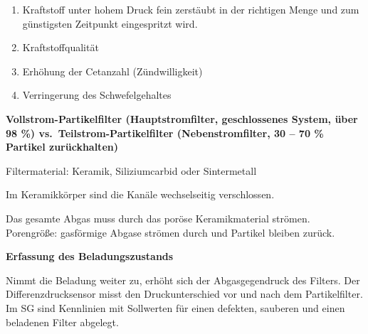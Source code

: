 \begin{enumerate}
\item
  Kraftstoff unter hohem Druck fein zerstäubt in der richtigen Menge und
  zum günstigsten Zeitpunkt eingespritzt wird.
\item
  Kraftstoffqualität
\item
  Erhöhung der Cetanzahl (Zündwilligkeit)
\item
  Verringerung des Schwefelgehaltes
\end{enumerate}

\textbf{Vollstrom-Partikelfilter (Hauptstromfilter, geschlossenes
System, über 98 \%) vs.~Teilstrom-Partikelfilter (Nebenstromfilter, 30
-- 70 \% Partikel zurückhalten)}

Filtermaterial: Keramik, Siliziumcarbid oder Sintermetall

Im Keramikkörper sind die Kanäle wechselseitig verschlossen.

Das gesamte Abgas muss durch das poröse Keramikmaterial strömen.
Porengröße: gasförmige Abgase strömen durch und Partikel bleiben zurück.

\textbf{Erfassung des Beladungszustands}

Nimmt die Beladung weiter zu, erhöht sich der Abgasgegendruck des
Filters. Der Differenzdrucksensor misst den Druckunterschied vor und
nach dem Partikelfilter. Im SG sind Kennlinien mit Sollwerten für einen
defekten, sauberen und einen beladenen Filter abgelegt.

